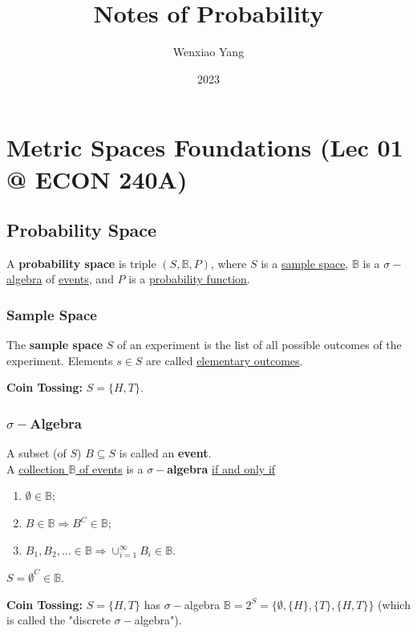 \documentclass[11pt]{elegantbook}
\title{Notes of Probability}
\author{Wenxiao Yang}
\institute{Haas School of Business, University of California Berkeley}
\date{2023}
\begin{document}
\maketitle

\frontmatter
\tableofcontents

\mainmatter


\chapter{Metric Spaces Foundations \small{(Lec 01 @ ECON 240A)}}
\section{Probability Space}
\begin{definition}
    \normalfont
    A \textbf{probability space} is triple $(S,\mathbb{B},P)$, where $S$ is a \underline{sample space}, $\mathbb{B}$ is a \underline{$\sigma-$algebra} of \underline{events}, and $P$ is a \underline{probability function}.
\end{definition}

\subsection{Sample Space}
\begin{definition}
    \normalfont
    The \textbf{sample space} $S$ of an experiment is the list of all possible outcomes of the experiment. Elements $s\in S$ are called \underline{elementary outcomes}.
\end{definition}
\begin{example}
    \textbf{Coin Tossing:} $S=\{H,T\}$.
\end{example}

\subsection{$\sigma-$Algebra}
\begin{definition}
    \normalfont
    A subset (of $S$) $B\subseteq S$ is called an \textbf{event}.\\
    A \underline{collection $\mathbb{B}$ of events} is a \textbf{$\sigma-$algebra} \underline{if and only if}
    \begin{enumerate}
        \item $\emptyset\in \mathbb{B}$;
        \item $B\in \mathbb{B} \Rightarrow B^C \in \mathbb{B}$;
        \item $B_1,B_2,...\in \mathbb{B} \Rightarrow \cup_{i=1}^\infty B_i\in \mathbb{B}$.
    \end{enumerate}
\end{definition}
\begin{note}
    $S=\emptyset^C\in \mathbb{B}$.
\end{note}
\begin{example}
    \textbf{Coin Tossing:} $S=\{H,T\}$ has $\sigma-$algebra $\mathbb{B}=2^S=\{\emptyset,\{H\},\{T\},\{H,T\}\}$ (which is called the "discrete $\sigma-$algebra").
\end{example}
\end{document}
